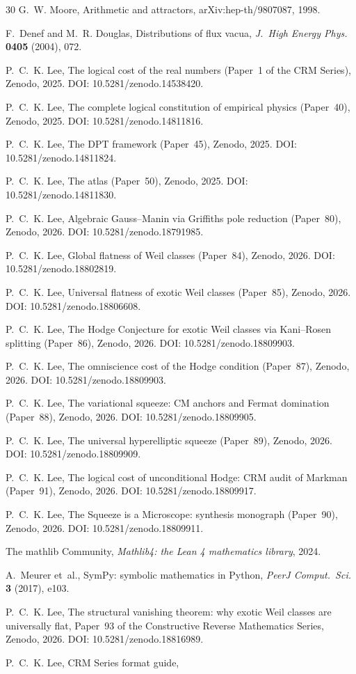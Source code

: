 \documentclass[11pt]{article}
\theoremstyle{plain}
\theoremstyle{definition}
\theoremstyle{remark}
\begin{document}
\begin{thebibliography}{30}
G.~W. Moore,
Arithmetic and attractors,
arXiv:hep-th/9807087, 1998.

F.~Denef and M.~R. Douglas,
Distributions of flux vacua,
\emph{J.\ High Energy Phys.} \textbf{0405} (2004), 072.

P.~C.~K. Lee,
The logical cost of the real numbers (Paper~1 of the CRM Series),
Zenodo, 2025. DOI: 10.5281/zenodo.14538420.

P.~C.~K. Lee,
The complete logical constitution of empirical physics (Paper~40),
Zenodo, 2025. DOI: 10.5281/zenodo.14811816.

P.~C.~K. Lee,
The DPT framework (Paper~45),
Zenodo, 2025. DOI: 10.5281/zenodo.14811824.

P.~C.~K. Lee,
The atlas (Paper~50),
Zenodo, 2025. DOI: 10.5281/zenodo.14811830.

P.~C.~K. Lee,
Algebraic Gauss--Manin via Griffiths pole reduction (Paper~80),
Zenodo, 2026. DOI: 10.5281/zenodo.18791985.

P.~C.~K. Lee,
Global flatness of Weil classes (Paper~84),
Zenodo, 2026. DOI: 10.5281/zenodo.18802819.

P.~C.~K. Lee,
Universal flatness of exotic Weil classes (Paper~85),
Zenodo, 2026. DOI: 10.5281/zenodo.18806608.

P.~C.~K. Lee,
The Hodge Conjecture for exotic Weil classes via Kani--Rosen splitting (Paper~86),
Zenodo, 2026. DOI: 10.5281/zenodo.18809903.

P.~C.~K. Lee,
The omniscience cost of the Hodge condition (Paper~87),
Zenodo, 2026. DOI: 10.5281/zenodo.18809903.

P.~C.~K. Lee,
The variational squeeze: CM anchors and Fermat domination (Paper~88),
Zenodo, 2026. DOI: 10.5281/zenodo.18809905.

P.~C.~K. Lee,
The universal hyperelliptic squeeze (Paper~89),
Zenodo, 2026. DOI: 10.5281/zenodo.18809909.

P.~C.~K. Lee,
The logical cost of unconditional Hodge: CRM audit of Markman (Paper~91),
Zenodo, 2026. DOI: 10.5281/zenodo.18809917.

P.~C.~K. Lee,
The Squeeze is a Microscope: synthesis monograph (Paper~90),
Zenodo, 2026. DOI: 10.5281/zenodo.18809911.

The mathlib Community,
\emph{Mathlib4: the Lean 4 mathematics library}, 2024.

A.~Meurer et~al.,
SymPy: symbolic mathematics in Python,
\emph{PeerJ Comput.\ Sci.} \textbf{3} (2017), e103.

P.~C.~K. Lee,
The structural vanishing theorem: why exotic Weil classes are universally flat,
Paper~93 of the Constructive Reverse Mathematics Series,
Zenodo, 2026. DOI: 10.5281/zenodo.18816989.

P.~C.~K. Lee,
CRM Series format guide,

\end{thebibliography}
\end{document}
